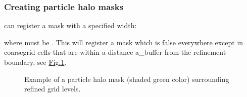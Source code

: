\documentclass[letterpaper,10pt,english]{sphinxmanual}
\let\sphinxpxdimen\pdfpxdimen\else\newdimen\sphinxpxdimen
\begin{document}
\begin{sphinxVerbatim}[commandchars=\\\{\},formatcom=\scriptsize]
 
 


   

\end{sphinxVerbatim}


\subsubsection{Creating particle halo masks}
\label{\detokenize{Source/Particles:creating-particle-halo-masks}}
 can register a  mask with a specified width:

\begin{sphinxVerbatim}[commandchars=\\\{\},formatcom=\scriptsize]
         
\end{sphinxVerbatim}

where  must be .
This will register a mask which is false everywhere except in coarse\sphinxhyphen{}grid cells that are within a distance a\_buffer from the refinement boundary, see \hyperref[\detokenize{Source/Particles:fig-halomask}]{Fig.\@ \ref{\detokenize{Source/Particles:fig-halomask}}}.

\begin{figure}[htb]
\centering
\capstart

\noindent\sphinxincludegraphics[width=360\sphinxpxdimen]{{HaloMask}.png}
\caption{Example of a particle halo mask (shaded green color) surrounding refined grid levels.}\label{\detokenize{Source/Particles:id2}}\label{\detokenize{Source/Particles:fig-halomask}}\end{figure}
\end{document}
